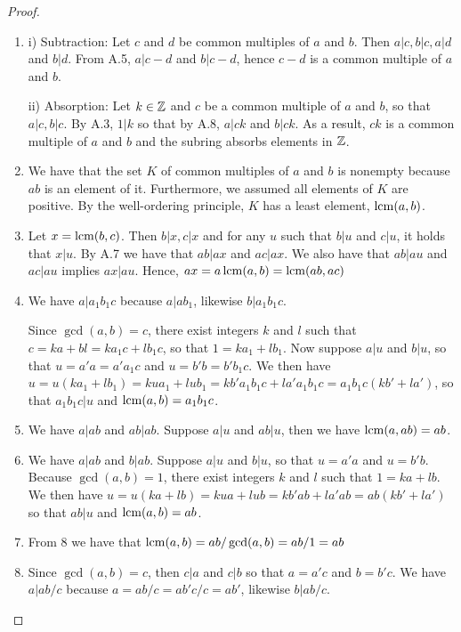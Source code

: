 \begin{proof}
 \begin{enumerate}
    \item i) Subtraction: Let $c$ and $d$ be common multiples of $a$ and $b$. Then $a\vert c, b\vert c, a\vert d$ and $b\vert d$. From A.5, $a\vert c-d$ and $b\vert c-d$, hence $c-d$ is a common multiple of $a$ and $b$.

    ii) Absorption: Let $k\in\mathbb{Z}$ and $c$ be a common multiple of $a$ and $b$, so that $a\vert c, b\vert c$. By A.3, $1\vert k$ so that by A.8, $a\vert ck$ and $b\vert ck$. As a result, $ck$ is a common multiple of $a$ and $b$ and the subring absorbs elements in $\mathbb{Z}$.
    \item We have that the set $K$ of common multiples of $a$ and $b$ is nonempty because $ab$ is an element of it. Furthermore, we assumed all elements of $K$ are positive. By the well-ordering principle, $K$ has a least element, $\operatorname*{lcm}(a,b)$.
    \item Let $x=\operatorname*{lcm}(b,c)$. Then $b\vert x, c\vert x$ and for any $u$ such that $b\vert u$ and $c\vert u$, it holds that $x\vert u$. By A.7 we have that $ab\vert ax$ and $ac\vert ax$. We also have that $ab\vert au$ and $ac\vert au$ implies $ax\vert au$. Hence, $ax=a\operatorname*{lcm}(a,b)=\operatorname*{lcm}(ab,ac)$
    \item We have $a\vert a_{1}b_{1}c$ because $a\vert ab_{1}$, likewise $b\vert a_{1}b_{1}c$. 

    Since $\gcd(a,b)=c$, there exist integers $k$ and $l$ such that $c=ka+bl=ka_{1}c+lb_{1}c$, so that $1=ka_{1}+lb_{1}$. Now suppose $a\vert u$ and $b\vert u$, so that $u=a'a=a'a_{1}c$ and $u=b'b=b'b_{1}c$. We then have $u= u(ka_{1}+lb_{1})= kua_{1}+lub_{1}= kb'a_{1}b_{1}c+la'a_{1}b_{1}c= a_{1}b_{1}c(kb'+la')$, so that $a_{1}b_{1}c\vert u$ and $\operatorname*{lcm}(a,b)=a_{1}b_{1}c$.
    \item We have $a\vert ab$ and $ab\vert ab$. Suppose $a\vert u$ and $ab\vert u$, then we have $\operatorname*{lcm}(a,ab)=ab$.
    \item We have $a\vert ab$ and $b\vert ab$. Suppose $a\vert u$ and $b\vert u$, so that $u=a'a$ and $u=b'b$. Because $\gcd(a,b)=1$, there exist integers $k$ and $l$ such that $1=ka+lb$. We then have $u=u(ka+lb)= kua+lub= kb'ab+la'ab= ab(kb'+la')$ so that $ab\vert u$ and $\operatorname*{lcm}(a,b)=ab$.
    \item From 8 we have that $\operatorname*{lcm}(a,b)=ab/\gcd(a,b)=ab/1=ab$
    \item Since $\gcd(a,b)=c$, then $c\vert a$ and $c\vert b$ so that $a=a'c$ and $b=b'c$. We have $a\vert ab/c$ because $a=ab/c=ab'c/c=ab'$, likewise $b\vert ab/c$. 


\end{enumerate}
\end{proof}
